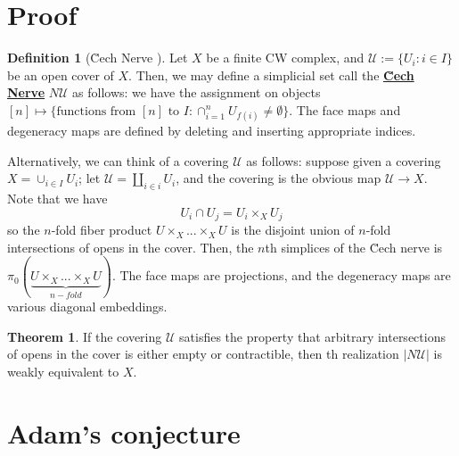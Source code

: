 \documentclass{article}
\theoremstyle{definition}
\newtheorem{theorem}{Theorem}[section]
\theoremstyle{definition}
\newtheorem{definition}{Definition}[theorem]
\theoremstyle{definition}
\theoremstyle{definition}
\theoremstyle{definition}
\theoremstyle{definition}
\theoremstyle{definition}
\begin{document}
\section{Proof}





















\begin{tcolorbox}[colback=purple!5!white,colframe=purple!75!black]
\begin{definition}[\u Cech Nerve ]
Let $X$ be a finite CW complex, and $\mathcal{U}:=\{U_i: i\in I\}$ be an open cover of $X$. Then, we may define a simplicial set call the \underline{\textbf{\u Cech Nerve}} $N \mathcal{U}$ as follows: we have the assignment on objects $[n]\mapsto \{\textrm{functions from }[n] \textrm{ to } I: \cap^n_{i=1}U_{f(i)}\neq \emptyset \}$. The face maps and degeneracy maps are defined by deleting and inserting appropriate indices. 
\end{definition}
\end{tcolorbox}

Alternatively, we can think of a covering $\mathcal{U}$ as follows: suppose given a covering $X=\cup_{i\in I}U_i$; let $\mathcal{U}=\coprod_{i\in i} U_i$, and the covering is the obvious map $\mathcal{U}\to X$. Note that we have 
\[U_i\cap U_j=U_i\times_X U_j\]
so the $n$-fold fiber product $U\times_X...\times_X U$ is the disjoint union of $n$-fold intersections of opens in the cover. Then, the $n$th simplices of the \u Cech nerve is $\pi_0(  \underbrace{U\times_X...\times_X U }_{n-fold})$. The face maps are projections, and the degeneracy maps are various diagonal embeddings.


\begin{tcolorbox}[colback=red!5!white,colframe=red!30!white]
\begin{theorem}
If the covering $\mathcal{U}$ satisfies the property that arbitrary intersections of opens in the cover is either empty or contractible, then th realization $|N \mathcal{U}|$ is weakly equivalent to $X$.
\end{theorem}
\end{tcolorbox}


\section{Adam's conjecture}
\end{document}
